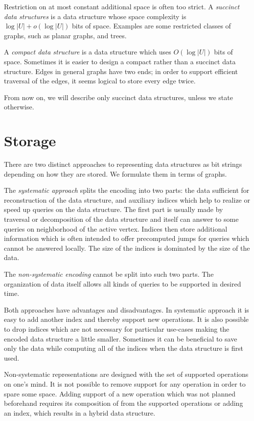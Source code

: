Restriction on at most constant additional space is often too strict.
A \emph{succinct data structures} is a data structure whose space complexity is $ \log |U| + o(\log |U|) $ bits of space.
Examples are some restricted classes of graphs, such as planar graphs, and trees.

A \emph{compact data structure} is a data structure which uses $ O(\log |U|) $ bits of space.
Sometimes it is easier to design a compact rather than a succinct data structure.
Edges in general graphs have two ends; in order to support efficient traversal of the edges, it seems logical to store every edge twice.

From now on, we will describe only succinct data structures, unless we state otherwise.

\section{Storage}

There are two distinct approaches to representing data structures as bit strings depending on how they are stored.
We formulate them in terms of graphs.

The \emph{systematic approach} splits the encoding into two parts: the data sufficient for reconstruction of the data structure, and auxiliary indices which help to realize or speed up queries on the data structure.
The first part is usually made by traversal or decomposition of the data structure and itself can answer to some queries on neighborhood of the active vertex.
Indices then store additional information which is often intended to offer precomputed jumps for queries which cannot be answered locally.
The size of the indices is dominated by the size of the data.

The \emph{non-systematic encoding} cannot be split into such two parts.
The organization of data itself allows all kinds of queries to be supported in desired time.

Both approaches have advantages and disadvantages.
In systematic approach it is easy to add another index and thereby support new operations.
It is also possible to drop indices which are not necessary for particular use-cases making the encoded data structure a little smaller.
Sometimes it can be beneficial to save only the data while computing all of the indices when the data structure is first used.

Non-systematic representations are designed with the set of supported operations on one's mind.
It is not possible to remove support for any operation in order to spare some space.
Adding support of a new operation which was not planned beforehand requires its composition of from the supported operations or adding an index, which results in a hybrid data structure.

